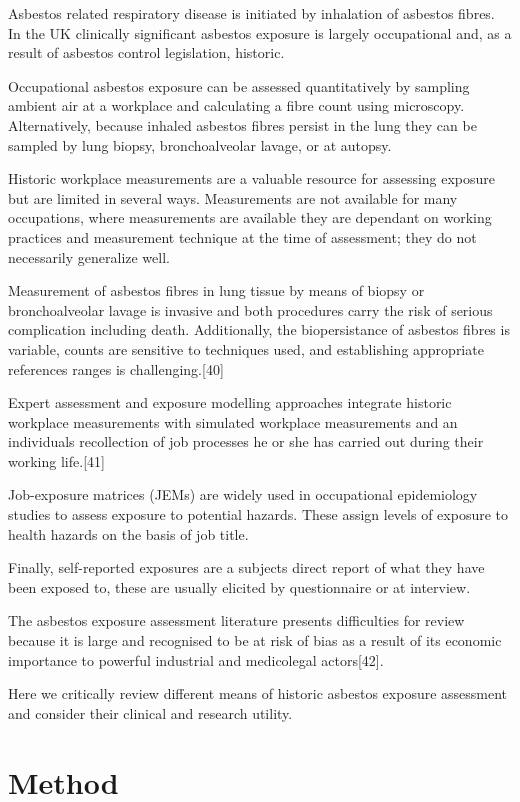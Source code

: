 \documentclass[12pt,a4paper,]{report}
\begin{document}
Asbestos related respiratory disease is initiated by inhalation of
asbestos fibres. In the UK clinically significant asbestos exposure is
largely occupational and, as a result of asbestos control legislation,
historic.

Occupational asbestos exposure can be assessed quantitatively by
sampling ambient air at a workplace and calculating a fibre count using
microscopy. Alternatively, because inhaled asbestos fibres persist in
the lung they can be sampled by lung biopsy, bronchoalveolar lavage, or
at autopsy.

Historic workplace measurements are a valuable resource for assessing
exposure but are limited in several ways. Measurements are not available
for many occupations, where measurements are available they are
dependant on working practices and measurement technique at the time of
assessment; they do not necessarily generalize well.

Measurement of asbestos fibres in lung tissue by means of biopsy or
bronchoalveolar lavage is invasive and both procedures carry the risk of
serious complication including death. Additionally, the biopersistance
of asbestos fibres is variable, counts are sensitive to techniques used,
and establishing appropriate references ranges is challenging.{[}40{]}

Expert assessment and exposure modelling approaches integrate historic
workplace measurements with simulated workplace measurements and an
individuals recollection of job processes he or she has carried out
during their working life.{[}41{]}

Job-exposure matrices (JEMs) are widely used in occupational
epidemiology studies to assess exposure to potential hazards. These
assign levels of exposure to health hazards on the basis of job title.

Finally, self-reported exposures are a subjects direct report of what
they have been exposed to, these are usually elicited by questionnaire
or at interview.

The asbestos exposure assessment literature presents difficulties for
review because it is large and recognised to be at risk of bias as a
result of its economic importance to powerful industrial and medicolegal
actors{[}42{]}.

Here we critically review different means of historic asbestos exposure
assessment and consider their clinical and research utility.

\hypertarget{method-2}{%
\section{Method}\label{method-2}}
\end{document}
